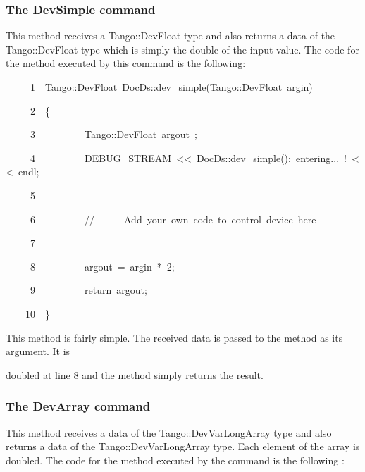 \subsubsection{The DevSimple command}

This method receives a Tango::DevFloat type
and also returns a data of the Tango::DevFloat type which is simply
the double of the input value. The code for the method executed by
this command is the following:


\begin{lyxcode}
~~~~~1~~Tango::DevFloat~DocDs::dev\_simple(Tango::DevFloat~argin)

~~~~~2~~\{

~~~~~3~~~~~~~~~~Tango::DevFloat~argout~;

~~~~~4~~~~~~~~~~DEBUG\_STREAM~<\textcompwordmark{}<~\textquotedbl{}DocDs::dev\_simple():~entering...~!\textquotedbl{}~<\textcompwordmark{}<~endl;

~~~~~5~~

~~~~~6~~~~~~~~~~//~~~~~~Add~your~own~code~to~control~device~here

~~~~~7~~

~~~~~8~~~~~~~~~~argout~=~argin~{*}~2;

~~~~~9~~~~~~~~~~return~argout;

~~~~10~~\}
\end{lyxcode}


This method is fairly simple. The received data is passed to the method
as its argument. It is

doubled at line 8 and the method simply returns the result.


\subsubsection{The DevArray command}

This method receives a data of the Tango::DevVarLongArray
type and also returns a data of the Tango::DevVarLongArray type. Each
element of the array is doubled. The code for the method executed
by the command is the following :

